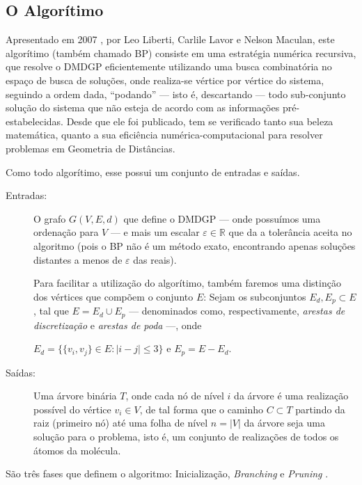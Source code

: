 \documentclass[a4paper,12pt]{article}
\begin{document}
	\subsection{O Algorítimo}
	Apresentado em 2007 \cite{carlile:BP}, por Leo Liberti, Carlile Lavor e Nelson Maculan, este algorítimo (também chamado BP) consiste em uma estratégia numérica recursiva, que resolve o DMDGP eficientemente utilizando uma busca combinatória no espaço de busca de soluções, onde realiza-se vértice por vértice do sistema, seguindo a ordem dada, ``podando'' --- isto é, descartando --- todo sub-conjunto solução do sistema que não esteja de acordo com as informações pré-estabelecidas. Desde que ele foi publicado, tem se verificado tanto sua beleza matemática, quanto a sua eficiência numérica-computacional para resolver problemas em Geometria de Distâncias.
	
	Como todo algorítimo, esse possui um conjunto de entradas e saídas.
	\begin{description}
		\item[Entradas:] O grafo $G(V, E, d)$ que define o DMDGP --- onde possuímos uma ordenação para $V$ --- e mais um escalar $\varepsilon \in \mathbb{R}$ que da a tolerância aceita no algoritmo (pois o BP não é um método exato, encontrando apenas soluções distantes a menos de $\varepsilon$ das reais).
		
		Para facilitar a utilização do algorítimo, também faremos uma distinção dos vértices que compõem o conjunto $E$: Sejam os subconjuntos $E_{d}, E_p \subset E$, tal que $E = E_{d} \cup E_{p}$ --- denominados como, respectivamente, \textit{arestas de discretização} e \textit{arestas de poda} ---, onde
		
		\begin{center}
			$E_{d} = \{\{v_i,v_j\} \in E : |i-j|\leq 3\}$ e $E_{p} = E - E_d$.
		\end{center}
		
		\item[Saídas:] Uma árvore binária $T$, onde cada nó de nível $i$ da árvore é uma realização possível do vértice $v_i \in V$, de tal forma que o caminho $C \subset T$ partindo da raiz (primeiro nó) até uma folha de nível $n = |V|$ da árvore seja uma solução para o problema, isto é, um conjunto de realizações de todos os átomos da molécula.
	\end{description}

	São três fases que definem o algoritmo: Inicialização, \textit{Branching} e \textit{Pruning} \cite{fidalgotese}.
		
\end{document}
